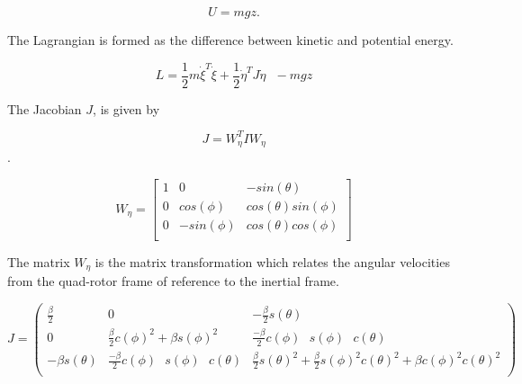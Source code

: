 \begin{equation}
    U = m g z.
\end{equation}


The Lagrangian is formed as the difference between kinetic and potential energy.

\begin{equation}
    L = \frac{1}{2}m\dot{\xi }^T\dot{\xi }+\frac{1}{2}\dot{\eta }^T   J   \dot{\eta }\text{  }- m g z
\end{equation}

The Jacobian $J$, is given by

\begin{equation}
    J = W_{\eta}^T I W_{\eta} 
\end{equation} .

\begin{equation}
 W_{\eta} = \left[ \begin{array}{ccc}

1 & 0 & -sin(\theta)\\ 0 & cos(\phi) & cos(\theta) sin(\phi)\\ 0 & -sin(\phi) & cos(\theta) cos(\phi)\\

\end{array} \right]
\end{equation}



\noindent The matrix $ W_{\eta}$ is the matrix transformation which relates the angular velocities from the quad-rotor frame of reference to the inertial frame.



\begin{equation}
\label{J}
J= \left(
\begin{array}{ccc}
 \frac{\beta }{2}    & 0                                                                    & -\frac{\beta }{2}s(\theta) \\
 0                   & \frac{\beta}{2} c(\phi)^2 + \beta s(\phi)^2                       & \frac{- \beta}{2} c(\phi) \text{ } s(\phi) \text{ } c(\theta)  \\
 -\beta s(\theta)   & \frac{- \beta}{2} c(\phi) \text{ } s(\phi) \text{ } c(\theta)    & \frac{\beta }{2}s(\theta)^2 + \frac{\beta }{2} s(\phi)^2  c(\theta)^2 + \beta  c(\phi)^2  c(\theta)^2  \\
\end{array}
\right)
\end{equation}




